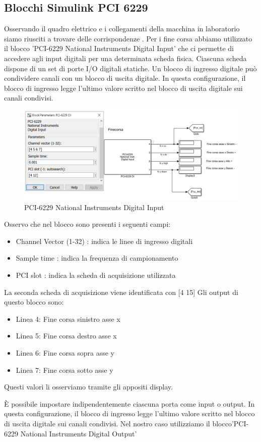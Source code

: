 \documentclass{article}
\begin{document}
\subsection{Blocchi Simulink PCI 6229}
Osservando il quadro elettrico e i collegamenti della macchina in laboratorio siamo riusciti a trovare delle corrispondenze .
Per i fine corsa abbiamo utilizzato il blocco 'PCI-6229 National Instruments Digital Input' che ci permette di accedere agli input digitali per una determinata scheda fisica. Ciascuna scheda dispone di un set di porte I/O digitali statiche. 
Un blocco di ingresso digitale può condividere canali con un blocco di uscita digitale. In questa configurazione, il blocco di ingresso legge l'ultimo valore scritto nel blocco di uscita digitale sui canali condivisi.

\begin{figure}[H]
\centering
\includegraphics[width=.6\textwidth]{./simulink_real/finecorsa.png}
\caption{PCI-6229 National Instruments Digital Input}
\end{figure}
Osservo che nel blocco sono presenti i seguenti campi:
\begin{itemize}
    \item  Channel Vector (1-32) : indica le linee di ingresso digitali
    \item  Sample time : indica la frequenza di campionamento
    \item PCI slot : indica la scheda di acquisizione utilizzata
\end{itemize}
La seconda scheda di acquisizione viene identificata con [4 15]
Gli output di questo blocco sono:
\begin{itemize}
    \item Linea 4: Fine corsa sinistro asse x
    \item Linea 5: Fine corsa destro asse x
    \item Linea 6: Fine corsa sopra asse y
    \item Linea 7: Fine corsa sotto asse y
\end{itemize}
Questi valori li osserviamo tramite gli appositi display.

È possibile impostare indipendentemente ciascuna porta come input o output.
In questa configurazione, il blocco di ingresso legge l'ultimo valore scritto nel blocco di uscita digitale sui canali condivisi.
Nel nostro caso utilizziamo il blocco'PCI-6229 National Instruments Digital Output' 
\end{document}
